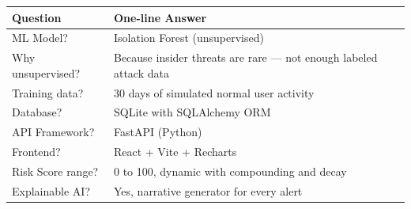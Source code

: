 \documentclass[12pt,a4paper]{article}
\begin{document}
\begin{longtable}{|p{4cm}|p{10cm}|}
\hline
\textbf{Question} & \textbf{One-line Answer} \\
\hline
ML Model? & Isolation Forest (unsupervised) \\
\hline
Why unsupervised? & Because insider threats are rare — not enough labeled attack data \\
\hline
Training data? & 30 days of simulated normal user activity \\
\hline
Database? & SQLite with SQLAlchemy ORM \\
\hline
API Framework? & FastAPI (Python) \\
\hline
Frontend? & React + Vite + Recharts \\
\hline
Risk Score range? & 0 to 100, dynamic with compounding and decay \\
\hline
Explainable AI? & Yes, narrative generator for every alert \\
\hline
\end{longtable}
\end{document}
